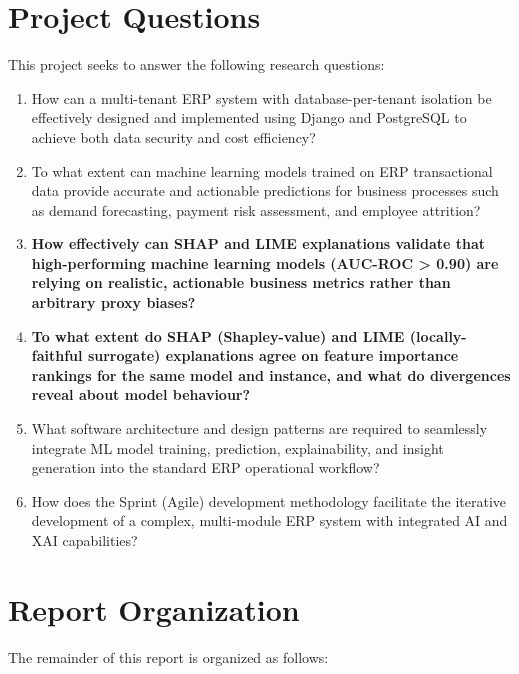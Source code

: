 \documentclass[12pt,a4paper]{report}
\begin{document}
\section{Project Questions}
\label{sec:questions}

This project seeks to answer the following research questions:

\begin{enumerate}[label=\textbf{RQ\arabic*:}]
  \item How can a multi-tenant ERP system with database-per-tenant isolation be effectively designed and implemented using Django and PostgreSQL to achieve both data security and cost efficiency?

  \item To what extent can machine learning models trained on ERP transactional data provide accurate and actionable predictions for business processes such as demand forecasting, payment risk assessment, and employee attrition?

  \item \textbf{How effectively can SHAP and LIME explanations validate that high-performing machine learning models (AUC-ROC > 0.90) are relying on realistic, actionable business metrics rather than arbitrary proxy biases?}

  \item \textbf{To what extent do SHAP (Shapley-value) and LIME (locally-faithful surrogate) explanations agree on feature importance rankings for the same model and instance, and what do divergences reveal about model behaviour?}

  \item What software architecture and design patterns are required to seamlessly integrate ML model training, prediction, explainability, and insight generation into the standard ERP operational workflow?

  \item How does the Sprint (Agile) development methodology facilitate the iterative development of a complex, multi-module ERP system with integrated AI and XAI capabilities?
\end{enumerate}

\section{Report Organization}
\label{sec:organization}

The remainder of this report is organized as follows:
\end{document}
